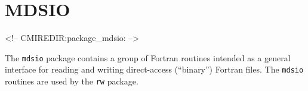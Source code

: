 

\section{MDSIO}
\label{sec:mdsio}
\label{sec:pkg:mdsio}
\begin{rawhtml}
<!-- CMIREDIR:package_mdsio: -->
\end{rawhtml}

The \texttt{mdsio} package contains a group of Fortran routines
intended as a general interface for reading and writing direct-access
(``binary'') Fortran files.  The \texttt{mdsio} routines are used by
the \texttt{rw} package.

